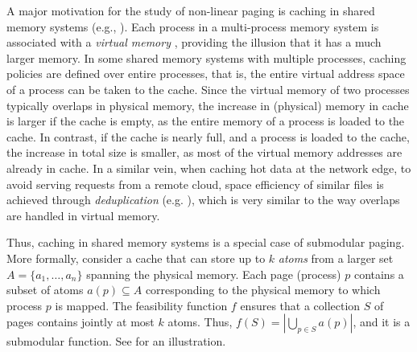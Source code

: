 \documentclass[11pt]{article}
\begin{document}
   
A major motivation for the study of non-linear paging %
is caching in shared memory systems (e.g., \cite{lilja1993cache, bennett1990adaptive, wilson1987hierarchical, suh2004dynamic}).  Each process in a multi-process memory system is associated with a {\em virtual memory} \cite{denning1970virtual}, providing the illusion that it has a much larger memory.  In some shared memory systems with multiple processes, caching policies are defined over entire processes, that is, the entire virtual address space of a process can be taken to the cache. Since the virtual memory of two processes typically overlaps in physical memory, the increase in (physical) memory in cache is larger if the cache is empty, as the entire memory of a process is loaded to the cache. In contrast, if the cache is nearly full, and a process is loaded to the cache, the increase in total size is smaller, as most of the virtual memory addresses are already in cache. In a similar vein, when caching hot data at the network edge, to avoid serving requests from a remote cloud, space efficiency of similar files is achieved through {\em deduplication} (e.g. \cite{LiL20}), which is very similar to the way overlaps are handled in virtual memory.
   
Thus, caching in shared memory systems is a special case of submodular paging. More formally, consider a cache that can store up to $k$ {\em atoms} from a larger set $A = \{a_1,\ldots, a_n\}$ spanning the physical memory. Each page (process) $p$ contains a subset of atoms $a(p) \subseteq A$ corresponding to the physical memory to which process $p$ is mapped. The feasibility function $f$ ensures that a collection $S$ of pages contains jointly at most $k$ atoms. Thus, $f(S) = \left| \bigcup_{p \in S} a(p) \right|$, and it is a submodular function. See  for an illustration. %
   
\end{document}
